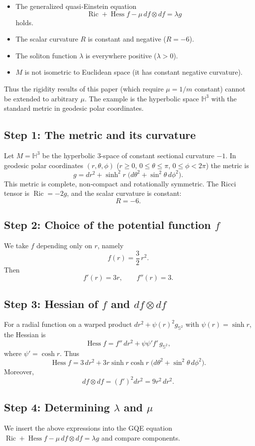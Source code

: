 \documentclass[12pt,a4paper]{article}
\newcommand{\Ric}{\operatorname{Ric}}
\newcommand{\Hess}{\operatorname{Hess}}
\theoremstyle{definition}
\theoremstyle{definition}
\begin{document}
\begin{itemize}
\item The generalized quasi‑Einstein equation
\[
\Ric + \Hess f - \mu\, df\otimes df = \lambda g
\]
holds.
\item The scalar curvature $R$ is constant and negative ($R=-6$).
\item The soliton function $\lambda$ is everywhere positive ($\lambda>0$).
\item $M$ is not isometric to Euclidean space (it has constant negative curvature).
\end{itemize}

Thus the rigidity results of this paper (which require $\mu=1/m$ constant)
cannot be extended to arbitrary $\mu$.  The example is the hyperbolic space
$\mathbb{H}^3$ with the standard metric in geodesic polar coordinates.

\subsection*{Step 1: The metric and its curvature}
Let $M=\mathbb{H}^3$ be the hyperbolic $3$-space of constant sectional curvature $-1$.
In geodesic polar coordinates $(r,\theta,\phi)$ ($r\ge0$, $0\le\theta\le\pi$, $0\le\phi<2\pi$)
the metric is
\[
g = dr^{2} + \sinh^{2}r\;\bigl(d\theta^{2} + \sin^{2}\theta\,d\phi^{2}\bigr).
\]
This metric is complete, non‑compact and rotationally symmetric.
The Ricci tensor is $\Ric = -2g$, and the scalar curvature is constant:
\[
R = -6.
\]

\subsection*{Step 2: Choice of the potential function $f$}
We take $f$ depending only on $r$, namely
\[
f(r) = \frac{3}{2}\,r^{2}.
\]
Then
\[
f'(r) = 3r,\qquad f''(r) = 3.
\]

\subsection*{Step 3: Hessian of $f$ and $df\otimes df$}
For a radial function on a warped product $dr^{2}+\psi(r)^{2}g_{\mathbb{S}^{2}}$ with
$\psi(r)=\sinh r$, the Hessian is
\[
\Hess f = f''\,dr^{2} + \psi\psi' f'\,g_{\mathbb{S}^{2}},
\]
where $\psi'=\cosh r$.
Thus
\[
\Hess f = 3\,dr^{2} + 3r\sinh r\cosh r\;\bigl(d\theta^{2}+\sin^{2}\theta\,d\phi^{2}\bigr).
\]
Moreover,
\[
df\otimes df = (f')^{2}dr^{2} = 9r^{2}\,dr^{2}.
\]

\subsection*{Step 4: Determining $\lambda$ and $\mu$}
We insert the above expressions into the GQE equation
$\Ric + \Hess f - \mu\,df\otimes df = \lambda g$ and compare components.
\end{document}
